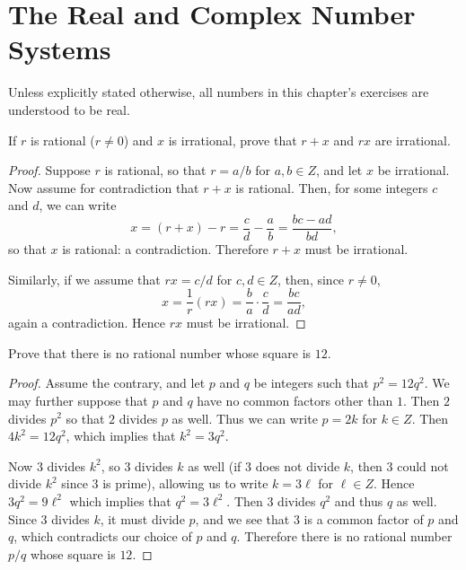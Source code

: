 \chapter{The Real and Complex Number Systems}

Unless explicitly stated otherwise, all numbers in this chapter's
exercises are understood to be real.

 If $r$ is rational ($r\neq0$) and $x$ is irrational, prove
that $r + x$ and $rx$ are irrational.
\begin{proof}
  Suppose $r$ is rational, so that $r = a/b$ for $a,b\in Z$, and let
  $x$ be irrational. Now assume for contradiction that $r + x$ is
  rational. Then, for some integers $c$ and $d$, we can write
  \begin{equation*}
    x = (r + x) - r = \frac{c}{d} - \frac{a}{b} = \frac{bc - ad}{bd},
  \end{equation*}
  so that $x$ is rational: a contradiction. Therefore $r + x$ must be
  irrational.

  Similarly, if we assume that $rx = c/d$ for $c,d\in Z$, then, since
  $r\neq0$,
  \begin{equation*}
    x = \frac1r(rx) = \frac{b}{a}\cdot\frac{c}{d} = \frac{bc}{ad},
  \end{equation*}
  again a contradiction. Hence $rx$ must be irrational.
\end{proof}

 Prove that there is no rational number whose square is
$12$.
\begin{proof}
  Assume the contrary, and let $p$ and $q$ be integers such that
  $p^2 = 12q^2$. We may further suppose that $p$ and $q$ have no
  common factors other than $1$. Then $2$ divides $p^2$ so that $2$
  divides $p$ as well. Thus we can write $p = 2k$ for $k\in Z$. Then
  $4k^2 = 12q^2$, which implies that $k^2 = 3q^2$.

  Now $3$ divides $k^2$, so $3$ divides $k$ as well (if $3$ does not
  divide $k$, then $3$ could not divide $k^2$ since $3$ is prime),
  allowing us to write $k = 3\ell$ for $\ell\in Z$. Hence
  $3q^2 = 9\ell^2$ which implies that $q^2 = 3\ell^2$. Then $3$
  divides $q^2$ and thus $q$ as well. Since $3$ divides $k$, it must
  divide $p$, and we see that $3$ is a common factor of $p$ and $q$,
  which contradicts our choice of $p$ and $q$. Therefore there is no
  rational number $p/q$ whose square is $12$.
\end{proof}

